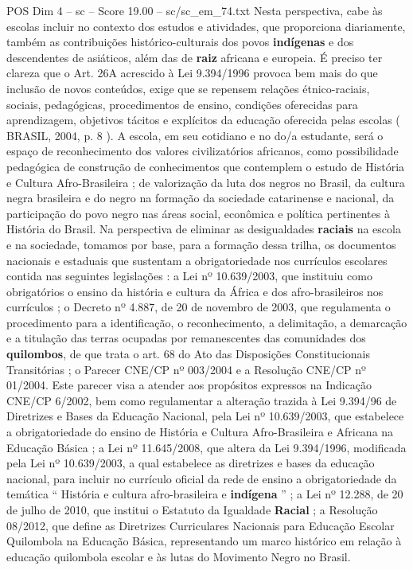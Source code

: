 \begin{textsample}{POS Dim 4 – sc – Score 19.00 – sc/sc\_em\_74.txt}
Nesta perspectiva, cabe às escolas incluir no contexto dos estudos e atividades, que proporciona diariamente, também as contribuições histórico-culturais dos povos \textbf{indígenas} e dos descendentes de asiáticos, além das de \textbf{raiz} africana e europeia.
É preciso ter clareza que o Art. 26A acrescido à Lei 9.394/1996 provoca bem mais do que inclusão de novos conteúdos, exige que se repensem relações étnico-raciais, sociais, pedagógicas, procedimentos de ensino, condições oferecidas para aprendizagem, objetivos tácitos e explícitos da educação oferecida pelas escolas ( BRASIL, 2004, p. 8 ).
A escola, em seu cotidiano e no do/a estudante, será o espaço de reconhecimento dos valores civilizatórios africanos, como possibilidade pedagógica de construção de conhecimentos que contemplem o estudo de História e Cultura Afro-Brasileira ; de valorização da luta dos negros no Brasil, da cultura negra brasileira e do negro na formação da sociedade catarinense e nacional, da participação do povo negro nas áreas social, econômica e política pertinentes à História do Brasil.
Na perspectiva de eliminar as desigualdades \textbf{raciais} na escola e na sociedade, tomamos por base, para a formação dessa trilha, os documentos nacionais e estaduais que sustentam a obrigatoriedade nos currículos escolares contida nas seguintes legislações : a Lei nº 10.639/2003, que instituiu como obrigatórios o ensino da história e cultura da África e dos afro-brasileiros nos currículos ; o Decreto nº 4.887, de 20 de novembro de 2003, que regulamenta o procedimento para a identificação, o reconhecimento, a delimitação, a demarcação e a titulação das terras ocupadas por remanescentes das comunidades dos \textbf{quilombos}, de que trata o art. 68 do Ato das Disposições Constitucionais Transitórias ; o Parecer CNE/CP nº 003/2004 e a Resolução CNE/CP nº 01/2004.
Este parecer visa a atender aos propósitos expressos na Indicação CNE/CP 6/2002, bem como regulamentar a alteração trazida à Lei 9.394/96 de Diretrizes e Bases da Educação Nacional, pela Lei nº 10.639/2003, que estabelece a obrigatoriedade do ensino de História e Cultura Afro-Brasileira e Africana na Educação Básica ; a Lei nº 11.645/2008, que altera da Lei 9.394/1996, modificada pela Lei nº 10.639/2003, a qual estabelece as diretrizes e bases da educação nacional, para incluir no currículo oficial da rede de ensino a obrigatoriedade da temática “ História e cultura afro-brasileira e \textbf{indígena} ” ; a Lei nº 12.288, de 20 de julho de 2010, que institui o Estatuto da Igualdade \textbf{Racial} ; a Resolução 08/2012, que define as Diretrizes Curriculares Nacionais para Educação Escolar Quilombola na Educação Básica, representando um marco histórico em relação à educação quilombola escolar e às lutas do Movimento Negro no Brasil.

\end{textsample}

